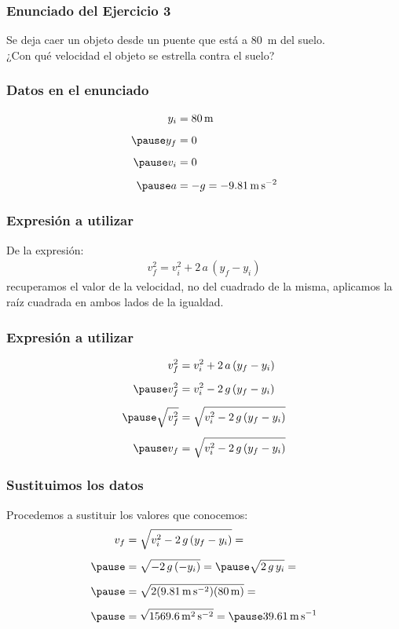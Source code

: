 \documentclass[14pt]{beamer}
\begin{document}
\begin{frame}
\frametitle{Enunciado del Ejercicio 3}
Se deja caer un objeto desde un puente que está a \SI{80}{\meter} del suelo.
\\
\bigskip
\pause
¿Con qué velocidad el objeto se estrella contra el suelo?
\end{frame}
\begin{frame}
\frametitle{Datos en el enunciado}
\begin{eqnarray*}
\begin{aligned}
y_{i} &= \SI{80}{\meter} \\[0.5em] \pause 
y_{f} & = 0 \\[0.5em] \pause 
v_{i} &= 0 \\[0.5em] \pause
a &= - g = -\SI{9.81}{\meter\per\square\second}
\end{aligned}
\end{eqnarray*}
\end{frame}
\begin{frame}
\frametitle{Expresión a utilizar}
De la expresión:
\pause
\begin{align*}
v_{f}^{2} = v_{i}^{2} + 2 \, a \, (y_{f} - y_{i})
\end{align*}
\pause
recuperamos el valor de la velocidad, no del cuadrado de la misma, \pause aplicamos la raíz cuadrada en ambos lados de la igualdad.
\end{frame}
\begin{frame}
\frametitle{Expresión a utilizar}
\begin{eqnarray*}
\begin{aligned}
v_{f}^{2} &= v_{i}^{2} + 2 \, a \, (y_{f} - y_{i}) \\[0.5em] \pause
v_{f}^{2} &= v_{i}^{2} - 2 \, g \, (y_{f} - y_{i}) \\[0.5em] \pause
\sqrt{v_{f}^{2}} &= \sqrt{v_{i}^{2} - 2 \, g \, (y_{f} - y_{i})} \\[0.5em] \pause
v_{f} &= \sqrt{v_{i}^{2} - 2 \, g \, (y_{f} - y_{i})}
\end{aligned}
\end{eqnarray*}
\end{frame}
\begin{frame}
\frametitle{Sustituimos los datos}
Procedemos a sustituir los valores que conocemos:
\pause
\begin{eqnarray*}
\begin{aligned}
v_{f} &= \sqrt{v_{i}^{2} - 2 \, g \, (y_{f} - y_{i})} = \\[0.5em] \pause
&= \sqrt{- 2 \, g \, (- y_{i})} = \pause \sqrt{ 2 \, g \, y_{i}} = \\[0.5em] \pause
&= \sqrt{2 (\SI{9.81}{\meter\per\square\second}) (\SI{80}{\meter})} = \\[0.5em] \pause
&= \sqrt{\SI{1569.6}{\square\meter\per\square\second}} = \pause \SI{39.61}{\meter\per\second}
\end{aligned}
\end{eqnarray*}
\end{frame}
\end{document}
